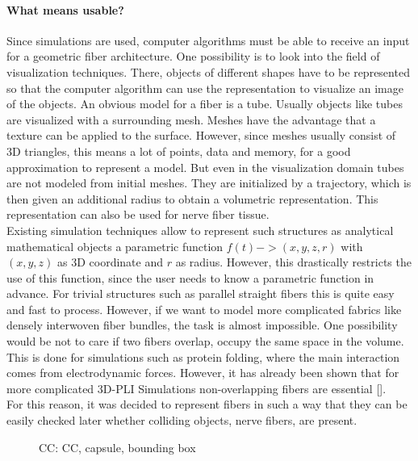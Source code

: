 \paragraph{What means usable?}
Since simulations are used, computer algorithms must be able to receive an input for a geometric fiber architecture.
One possibility is to look into the field of visualization techniques.
There, objects of different shapes have to be represented so that the computer algorithm can use the representation to visualize an image of the objects.
An obvious model for a fiber is a tube.
Usually objects like tubes are visualized with a surrounding mesh.
Meshes have the advantage that a texture can be applied to the surface.
However, since meshes usually consist of 3D triangles, this means a lot of points, \ie{} data and memory, for a good approximation to represent a model.
But even in the visualization domain tubes are not modeled from initial meshes.
They are initialized by a trajectory, which is then given an additional radius to obtain a volumetric representation.
This representation can also be used for nerve fiber tissue.
\\
% 
Existing simulation techniques \dummy{} allow to represent such structures as analytical mathematical objects \eg{} a parametric function $f(t) -> (x,y,z,r)$ with $(x,y,z)$ as 3D coordinate and $r$ as radius.
However, this drastically restricts the use of this function, since the user needs to know a parametric function in advance.
For trivial structures such as parallel straight fibers this is quite easy and fast to process.
However, if we want to model more complicated fabrics like densely interwoven fiber bundles, the task is almost impossible.
One possibility would be not to care if two fibers overlap, \ie{} occupy the same space in the volume.
This is done \eg{} for simulations such as protein folding, where the main interaction comes from electrodynamic forces.
However, it has already been shown that for more complicated \ac{3D-PLI} Simulations non-overlapping fibers are essential [\dummy{}].
\\
% 
For this reason, it was decided to represent fibers in such a way that they can be easily checked later whether colliding objects, \ie{} nerve fibers, are present.
\\
% 
\begin{figure}[!t]
    \centering
    \setlength{\tikzwidth}{0.75\textwidth}
    \tikzset{external/export=false}
	\caption[cc and co]{\Acf{CC}:  \ac{CC},  capsule,  bounding box}
	\label{fig:conical_capsule}
\end{figure}
